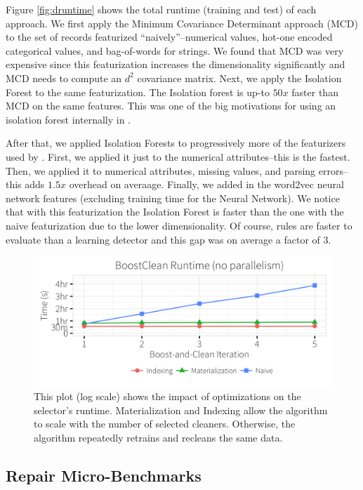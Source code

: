  Figure  \ref{fig:druntime} shows the total runtime (training and test) of each  approach.
 We first apply the Minimum Covariance Determinant approach (MCD) to the set of records featurized ``naively''--numerical values, hot-one encoded categorical values, and bag-of-words for strings.
 We found that MCD was very expensive since this featurization increases the dimensionality significantly and MCD needs to compute an $d^2$ covariance matrix.
 Next, we apply the Isolation Forest to the same featurization.
 The Isolation forest is up-to $50x$ faster than MCD on the same features.
 This was one of the big motivations for using an isolation forest internally in \sys.
 
 After that, we applied Isolation Forests to progressively more of the featurizers used by \sys.
 First, we applied it just to the numerical attributes--this is the fastest.
 Then, we applied it to numerical attributes, missing values, and parsing errors--this adds $1.5x$ overhead on averaage.
 Finally, we added in the word2vec neural network features (excluding training time for the Neural Network).
 We notice that with this featurization the Isolation Forest is faster than the one with the naive featurization due to the lower dimensionality.
 Of course, rules are faster to evaluate than a learning detector and this gap was on average a factor of 3.
 
 \begin{figure}[t]
\centering
 \includegraphics[width=0.9\columnwidth]{exp/opt1.png}
 \caption{This plot (log scale) shows the impact of optimizations on the selector's runtime. Materialization and Indexing allow the algorithm to scale with the number of selected cleaners. Otherwise, the algorithm repeatedly retrains and recleans the same data.
 \label{fig:opt}}
\end{figure}
 
 \subsection{Repair Micro-Benchmarks }
 
